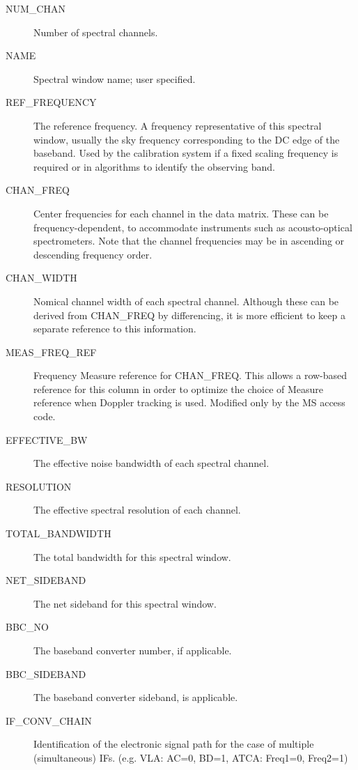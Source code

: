 \documentclass{article}
\begin{document}
\begin{itemize}
\begin{description}
\item[NUM\_CHAN] Number of spectral channels.

\item[NAME] Spectral window name; user specified.

\item[REF\_FREQUENCY] The reference frequency. A frequency
representative of this spectral window, usually the sky frequency
corresponding to the DC edge of the baseband. Used by the calibration
system if a fixed scaling frequency is required or in algorithms to
identify the observing band.

\item[CHAN\_FREQ] Center frequencies for each channel in the data
matrix. These can be frequency-dependent, to accommodate instruments
such as acousto-optical spectrometers. Note that the channel
frequencies may be in ascending or descending frequency order.

\item[CHAN\_WIDTH] Nomical channel width of each spectral
channel. Although these can be derived from CHAN\_FREQ by
differencing, it is more efficient to keep a separate reference to
this information.

\item[MEAS\_FREQ\_REF] Frequency Measure reference for
CHAN\_FREQ. This allows a row-based reference for this column in order to
optimize the choice of Measure reference when Doppler tracking is
used. Modified only by the MS access code.

\item[EFFECTIVE\_BW] The effective noise bandwidth of each spectral channel.

\item[RESOLUTION] The effective spectral resolution of each channel.

\item[TOTAL\_BANDWIDTH] The total bandwidth for this spectral window.

\item[NET\_SIDEBAND] The net sideband for this spectral window.

\item[BBC\_NO] The baseband converter number, if applicable.

\item[BBC\_SIDEBAND] The baseband converter sideband, is applicable.

\item[IF\_CONV\_CHAIN] Identification of the electronic signal
path for the case of multiple (simultaneous) IFs. (e.g. VLA: AC=0,
BD=1, ATCA: Freq1=0, Freq2=1)


\end{description}
\end{itemize}
\end{document}
